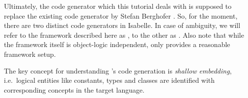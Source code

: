 \begin{isabellebody}
\begin{isamarkuptext}
  \begin{warn}
    Ultimately, the code generator which this tutorial deals with
    is supposed to replace the existing code generator
    by Stefan Berghofer \cite{Berghofer-Nipkow:2002}.
    So, for the moment, there are two distinct code generators
    in Isabelle.  In case of ambiguity, we will refer to the framework
    described here as , to the
    other as .
    Also note that while the framework itself is
    object-logic independent, only \hyperlink{theory.HOL}{\mbox{}} provides a reasonable
    framework setup.    
  \end{warn}%
\end{isamarkuptext}%
\isamarkuptrue%
%
\isamarkuptrue%
%
\begin{isamarkuptext}%
The key concept for understanding 's code generation is
  \emph{shallow embedding}, i.e.~logical entities like constants, types and
  classes are identified with corresponding concepts in the target language.


\end{isamarkuptext}
\end{isabellebody}
